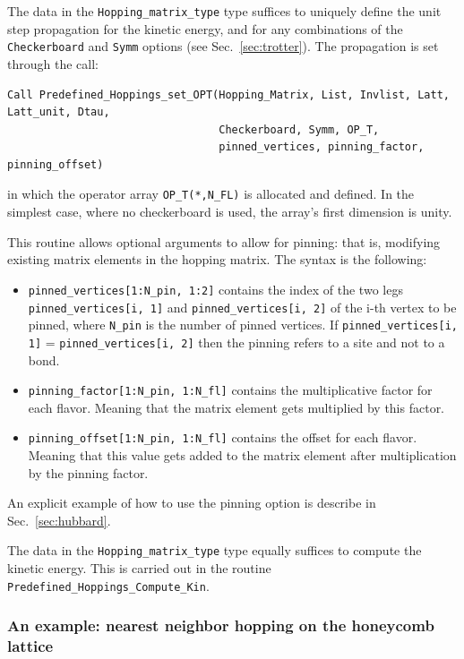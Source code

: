 The  data in the \verb|Hopping_matrix_type| type suffices to uniquely define the  unit step propagation for the kinetic energy, and for  any combinations of the  \texttt{Checkerboard} and  \texttt{Symm}  options (see Sec.~\ref{sec:trotter}). The propagation is set through the call: 
\begin{lstlisting}[style=fortran]
Call Predefined_Hoppings_set_OPT(Hopping_Matrix, List, Invlist, Latt, Latt_unit, Dtau,
                                 Checkerboard, Symm, OP_T,
                                 pinned_vertices, pinning_factor, pinning_offset) 
\end{lstlisting}
in which the operator array \verb|OP_T(*,N_FL)| is allocated and defined. In the simplest case, where no checkerboard is used, the array's first dimension is unity.

This routine allows optional arguments to allow for pinning: that is, modifying existing matrix elements in the hopping matrix. The syntax is the following: 
\begin{itemize}
\item \verb|pinned_vertices[1:N_pin, 1:2]| contains the index of the two legs \verb|pinned_vertices[i, 1]| and \verb|pinned_vertices[i, 2]| of the i-th vertex to be pinned, where \verb|N_pin| is the number of pinned vertices. If \verb|pinned_vertices[i, 1]| = \verb|pinned_vertices[i, 2]| then the pinning refers to a site and not to a bond.
\item \verb|pinning_factor[1:N_pin, 1:N_fl]| contains the multiplicative factor for each flavor. Meaning that the matrix element gets multiplied by this factor.
\item \verb|pinning_offset[1:N_pin, 1:N_fl]| contains the offset for each flavor. Meaning that this value gets added to the matrix element after multiplication by the pinning factor.
\end{itemize}

An explicit example of how to use the pinning option is describe in Sec.~\ref{sec:hubbard}.

The   data in  the \verb|Hopping_matrix_type| type   equally  suffices to compute  the kinetic energy.  This is carried out in the routine \verb|Predefined_Hoppings_Compute_Kin|.

\subsubsection{An example:   nearest neighbor hopping on the   honeycomb lattice }

